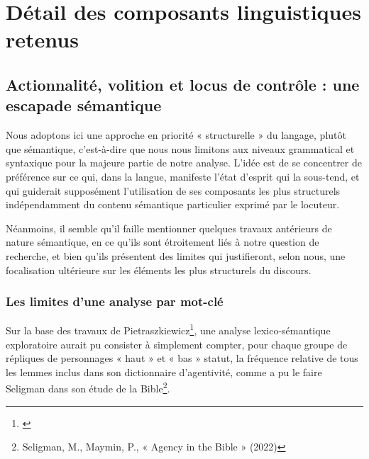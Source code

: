 \part{Détail des composants linguistiques retenus}

\chapter{Actionnalité, volition et locus de contrôle : une escapade sémantique}

Nous adoptons ici une approche en priorité « structurelle »  du langage, plutôt que sémantique, c'est-à-dire que nous nous limitons aux niveaux grammatical et syntaxique pour la majeure partie de notre analyse. L'idée est de se concentrer de préférence sur ce qui, dans la langue, manifeste l'état d'esprit qui la sous-tend, et qui guiderait supposément l'utilisation de ses composants les plus structurels indépendamment du contenu sémantique particulier exprimé par le locuteur.

Néanmoins, il semble qu'il faille mentionner quelques travaux antérieurs de nature sémantique, en ce qu'ils sont étroitement liés à notre question de recherche, et bien qu’ils présentent des limites qui justifieront, selon nous, une focalisation ultérieure sur les éléments les plus structurels du discours.

\section{Les limites d’une analyse par mot-clé}

Sur la base des travaux de Pietraszkiewicz\footnote{\cite{pietraszkiewicz_big_2019}}, une analyse lexico-sémantique exploratoire aurait pu consister à simplement compter, pour chaque groupe de répliques de personnages « haut »  et « bas » statut, la fréquence relative de tous les lemmes inclus dans son dictionnaire d’agentivité, comme a pu le faire Seligman dans son étude de la Bible\footnote{Seligman, M., Maymin, P., « Agency in the Bible » (2022)}.

